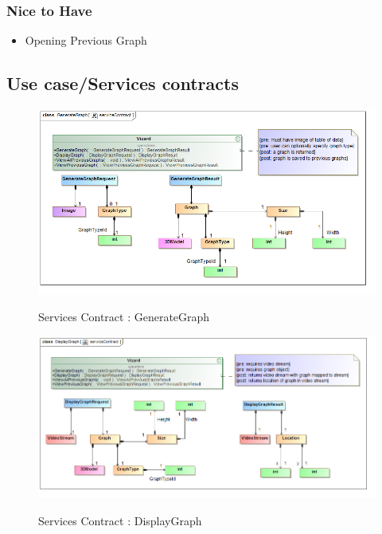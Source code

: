 \documentclass[a4paper,12pt]{article}
\begin{document}
	\subsubsection{Nice to Have}
		\begin{itemize}
			\item Opening Previous Graph
		\end{itemize}

\subsection{Use case/Services contracts}
	\begin{figure}[H]
		\includegraphics[width=\textwidth]{Images/class__GenerateGraph__serviceContract.png}  \\
		\caption{Services Contract : GenerateGraph}
	\end{figure}
	\begin{figure}[H]
		\includegraphics[width=\textwidth]{Images/class__DisplayGraph__serviceContract.png}  \\
		\caption{Services Contract : DisplayGraph}
	\end{figure}
\end{document}
